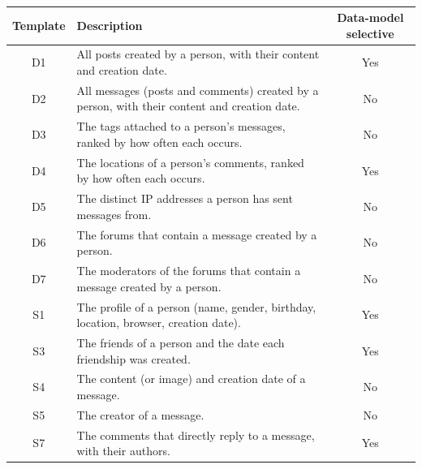 \begin{table}[h]
    \centering
    \ifreview\color{revtwo}\fi
    \begin{tabular}{|c|l|c|}
        \hline
        \textbf{Template} & \textbf{Description} & \textbf{Data-model selective} \\
        \hline
        D1 & All posts created by a person, with their content and creation date. & Yes \\
        \hline
        D2 & All messages (posts and comments) created by a person, with their content and creation date. & No \\
        \hline
        D3 & The tags attached to a person's messages, ranked by how often each occurs. & No \\
        \hline
        D4 & The locations of a person's comments, ranked by how often each occurs. & Yes \\
        \hline
        D5 & The distinct IP addresses a person has sent messages from. & No \\
        \hline
        D6 & The forums that contain a message created by a person. & No \\
        \hline
        D7 & The moderators of the forums that contain a message created by a person. & No \\
        \hline
        S1 & The profile of a person (name, gender, birthday, location, browser, creation date). & Yes \\
        \hline
        S3 & The friends of a person and the date each friendship was created. & Yes \\
        \hline
        S4 & The content (or image) and creation date of a message. & No \\
        \hline
        S5 & The creator of a message. & No \\
        \hline
        S7 & The comments that directly reply to a message, with their authors. & Yes \\
        \hline
    \end{tabular}
    \caption{}
    \label{tab:queryTemplateDescription}
\end{table}
\FloatBarrier

\begin{Rtwo}

\end{Rtwo}

\begin{Rtwo}

\end{Rtwo}

\begin{Rtwo}

\end{Rtwo}